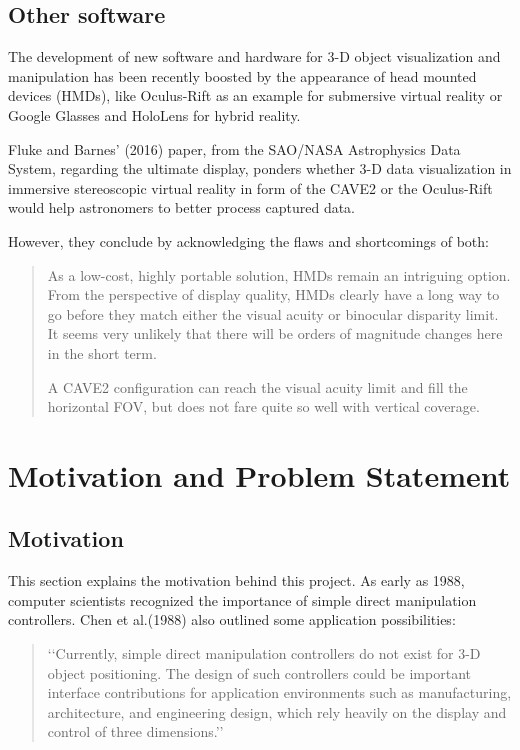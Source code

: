 \documentclass[12pt]{extarticle}
\begin{document}
\subsection {Other software}
The development of new software and hardware for 3-D object visualization and manipulation has been recently boosted by the appearance of head mounted devices (HMDs), like Oculus-Rift as an example for submersive virtual reality or Google Glasses and HoloLens for hybrid reality.

Fluke and Barnes\rq{} (2016)\cite{NASA} paper, from the SAO/NASA Astrophysics Data System, regarding the ultimate display, ponders whether 3-D data visualization in immersive stereoscopic virtual reality in form of the CAVE2 or the Oculus-Rift would help astronomers to better process captured data.

However, they conclude by acknowledging the flaws and shortcomings of both:
\begin{quotation}
As a low-cost, highly portable solution, HMDs remain an intriguing option. From the perspective of display quality, HMDs clearly have a long way to go before they match either the visual acuity or binocular disparity limit. It seems very unlikely that there will be orders of magnitude changes here in the short term.

A CAVE2 configuration can reach the visual acuity limit and fill the horizontal FOV, but does not fare quite so well with vertical coverage. \cite{NASA}
\end{quotation}

\section{Motivation and Problem Statement}\label{sec:Mot}
\subsection{Motivation}
This section explains the motivation behind this project. As early as 1988, computer scientists recognized the importance of simple direct manipulation controllers. Chen et al.(1988) also outlined some application possibilities:
\begin{quotation}
\lq\lq{}Currently, simple direct manipulation controllers do not exist for 3-D object positioning. The design of such controllers could be important interface contributions for application environments such as manufacturing, architecture, and engineering design, which rely heavily on the display and control of three dimensions.\rq\rq{} \cite{3DOn2D88}
\end{quotation}
\end{document}
